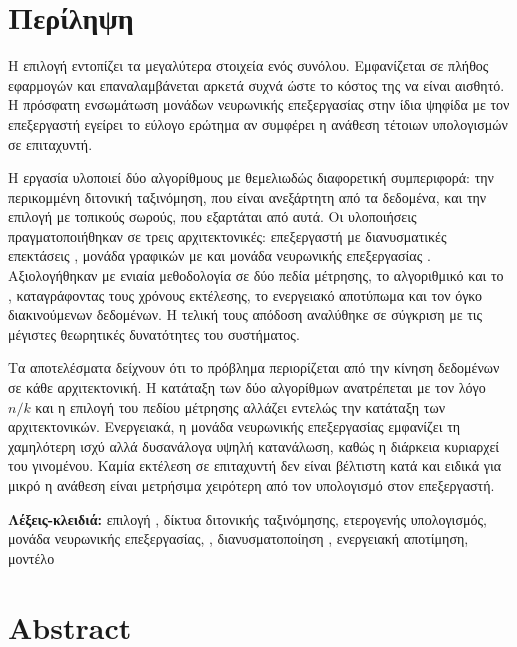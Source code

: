 \chapter*{Περίληψη}
\label{ch:abstract-el}

Η επιλογή  εντοπίζει τα  μεγαλύτερα στοιχεία ενός συνόλου.
Εμφανίζεται σε πλήθος εφαρμογών και επαναλαμβάνεται αρκετά συχνά ώστε το κόστος
της να είναι αισθητό. Η πρόσφατη ενσωμάτωση μονάδων νευρωνικής επεξεργασίας
στην ίδια ψηφίδα με τον επεξεργαστή εγείρει το εύλογο ερώτημα αν συμφέρει η
ανάθεση τέτοιων υπολογισμών σε επιταχυντή.

Η εργασία υλοποιεί δύο αλγορίθμους με θεμελιωδώς διαφορετική συμπεριφορά: την
περικομμένη διτονική ταξινόμηση, που είναι ανεξάρτητη από τα δεδομένα, και την
επιλογή με τοπικούς σωρούς, που εξαρτάται από αυτά. Οι υλοποιήσεις
πραγματοποιήθηκαν σε τρεις αρχιτεκτονικές: επεξεργαστή με διανυσματικές
επεκτάσεις , μονάδα γραφικών με  και μονάδα νευρωνικής
επεξεργασίας . Αξιολογήθηκαν με ενιαία μεθοδολογία σε δύο πεδία
μέτρησης, το αλγοριθμικό και το , καταγράφοντας τους χρόνους
εκτέλεσης, το ενεργειακό αποτύπωμα και τον όγκο διακινούμενων δεδομένων. Η
τελική τους απόδοση αναλύθηκε σε σύγκριση με τις μέγιστες θεωρητικές
δυνατότητες του συστήματος.

Τα αποτελέσματα δείχνουν ότι το πρόβλημα περιορίζεται από την κίνηση δεδομένων
σε κάθε αρχιτεκτονική. Η κατάταξη των δύο αλγορίθμων ανατρέπεται με τον λόγο
$n/k$ και η επιλογή του πεδίου μέτρησης αλλάζει εντελώς την κατάταξη των
αρχιτεκτονικών. Ενεργειακά, η μονάδα νευρωνικής επεξεργασίας εμφανίζει τη
χαμηλότερη ισχύ αλλά δυσανάλογα υψηλή κατανάλωση, καθώς η διάρκεια κυριαρχεί
του γινομένου. Καμία εκτέλεση σε επιταχυντή δεν είναι βέλτιστη κατά 
και ειδικά για μικρό  η ανάθεση είναι μετρήσιμα χειρότερη από τον
υπολογισμό στον επεξεργαστή.

\vspace{1em}

\textbf{Λέξεις-κλειδιά:} επιλογή , δίκτυα διτονικής ταξινόμησης,
ετερογενής υπολογισμός, μονάδα νευρωνικής επεξεργασίας, ,
διανυσματοποίηση , ενεργειακή αποτίμηση, μοντέλο 


\chapter*{Abstract}
\label{ch:abstract-en}


